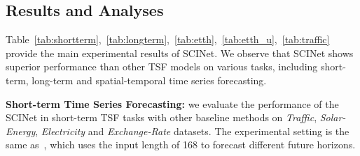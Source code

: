 \documentclass{article}
\begin{document}
\subsection{Results and Analyses}
\label{sec:comparison_sota}
Table~\ref{tab:shortterm},~\ref{tab:longterm},~\ref{tab:etth},~\ref{tab:etth_u},~\ref{tab:traffic} provide the main experimental results of SCINet. We observe that SCINet shows superior performance than other TSF models on various tasks, including short-term, long-term and spatial-temporal time series forecasting.

\vspace{5pt}
\textbf{Short-term Time Series Forecasting:} 
we evaluate the performance of the SCINet in short-term TSF tasks with other baseline methods on \emph{Traffic}, \emph{Solar-Energy}, \emph{Electricity} and \emph{Exchange-Rate} datasets. The experimental setting is the same as~\citep{Lai2018ModelingLA}, which uses the input length of 168 to forecast different future horizons. 
\end{document}
